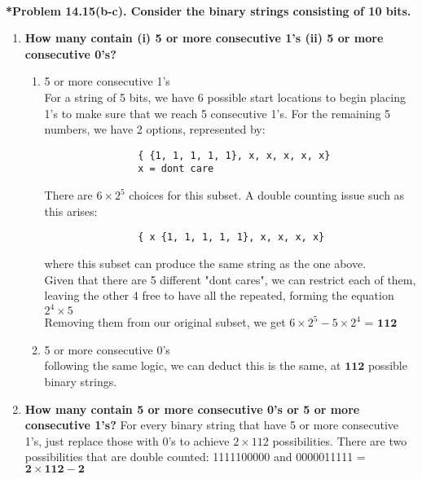 \documentclass{article}
\begin{document}
    \noindent\\[0.25in]
    \noindent \textbf{*Problem 14.15(b-c). Consider the binary strings consisting of 10 bits.}
    \begin{enumerate}[label=(\alph*)]
        \item \textbf{How many contain (i) 5 or more consecutive 1’s (ii) 5 or more consecutive 0’s?}
        \begin{enumerate}[label=(\roman*)]
            \item 5 or more consecutive 1's
            \\ For a string of 5 bits, we have 6 possible start locations to begin placing 1's to make 
            sure that we reach 5 consecutive 1's. For the remaining 5 numbers, we have 2 options, represented
            by:
            \begin{verbatim}
                { {1, 1, 1, 1, 1}, x, x, x, x, x}
                x = dont care
            \end{verbatim}
            There are $6 \times 2^5$ choices for this subset. A double counting issue such as this arises:
            \begin{verbatim}
                { x {1, 1, 1, 1, 1}, x, x, x, x}
            \end{verbatim}
            where this subset can produce the same string as the one above.\\
            Given that there are 5 different "dont cares", we can restrict each of them, leaving the other 4 free to have all the repeated, forming the equation $2^4 \times 5$\\
            Removing them from our original subset, we get $6 \times 2^5 - 5 \times 2^4$ = {\LARGE $\boxed{\mathbf{112}}$}
            \item 5 or more consecutive 0's
            \\ following the same logic, we can deduct this is the same, at {\LARGE $\boxed{\mathbf{112}}$}
            possible binary strings.
        \end{enumerate}
        \item \textbf{How many contain 5 or more consecutive 0’s or 5 or more consecutive 1’s?}
        For every binary string that have 5 or more consecutive 1's, just replace those with 0's
        to achieve $2 \times 112$ possibilities. There are two possibilities that are double
        counted: 1111100000 and 0000011111 = {\LARGE $\boxed{\mathbf{2 \times 112 - 2}}$}
    \end{enumerate}
\end{document}
